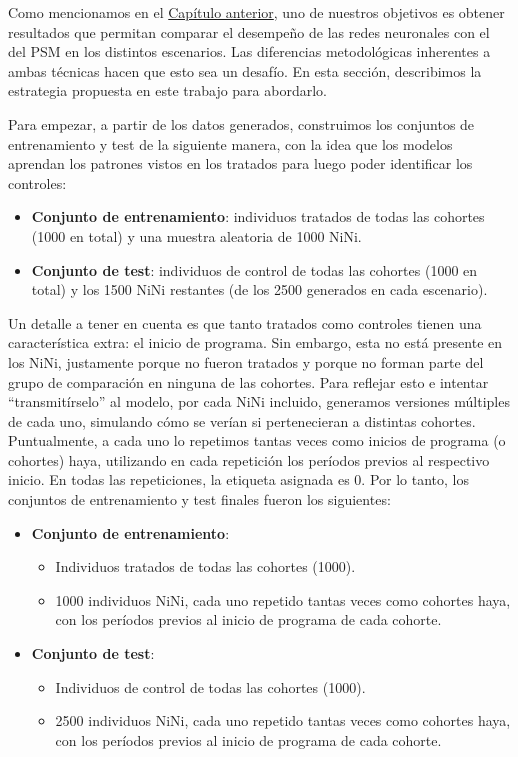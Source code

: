 \documentclass[../../main.tex]{subfiles}
\begin{document}
Como mencionamos en el \hyperref[sec:problema]{Capítulo anterior}, uno de nuestros objetivos es
obtener resultados que permitan comparar el desempeño de las redes neuronales con el del
PSM en los distintos escenarios. Las diferencias metodológicas inherentes a ambas técnicas
hacen que esto sea un desafío. En esta sección, describimos la estrategia propuesta en
este trabajo para abordarlo.

Para empezar, a partir de los datos generados, construimos los conjuntos de entrenamiento
y test de la siguiente manera, con la idea que los modelos aprendan los patrones vistos en
los tratados para luego poder identificar los controles:
\begin{itemize}
    \item \textbf{Conjunto de entrenamiento}: individuos tratados de todas las cohortes
    (1000 en total) y una muestra aleatoria de 1000 NiNi.
    \item \textbf{Conjunto de test}: individuos de control de todas las cohortes (1000 en
    total) y los 1500 NiNi restantes (de los 2500 generados en cada escenario).
\end{itemize}

Un detalle a tener en cuenta es que tanto tratados como controles tienen una
característica extra: el inicio de programa. Sin embargo, esta no está presente en los
NiNi, justamente porque no fueron tratados y porque no forman parte del grupo de
comparación en ninguna de las cohortes. Para reflejar esto e intentar ``transmitírselo''
al modelo, por cada NiNi incluido, generamos versiones múltiples de cada uno, simulando
cómo se verían si pertenecieran a distintas cohortes. Puntualmente, a cada uno lo
repetimos tantas veces como inicios de programa (o cohortes) haya, utilizando en cada
repetición los períodos previos al respectivo inicio. En todas las repeticiones, la
etiqueta asignada es 0. Por lo tanto, los conjuntos de entrenamiento y test finales fueron
los siguientes:
\begin{itemize}
    \item \textbf{Conjunto de entrenamiento}:\vspace{-0.2cm}
        \begin{itemize}
            \item Individuos tratados de todas las cohortes (1000).
            \item 1000 individuos NiNi, cada uno repetido tantas veces como cohortes haya,
            con los períodos previos al inicio de programa de cada cohorte.
        \end{itemize}
    \item \textbf{Conjunto de test}:\vspace{-0.2cm}
        \begin{itemize}
            \item Individuos de control de todas las cohortes (1000).
            \item 2500 individuos NiNi, cada uno repetido tantas veces como cohortes haya,
            con los períodos previos al inicio de programa de cada cohorte.
        \end{itemize}
\end{itemize}
\end{document}
